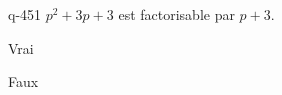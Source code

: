 \begin{truefalse}{q-451}
$p^2+3p+3$ est factorisable par $p+3$.
\item Vrai
\item* Faux
\end{truefalse}

